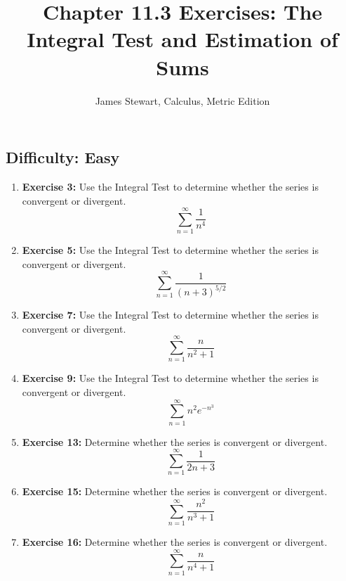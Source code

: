 \documentclass[12pt, a4paper]{article}
\title{Chapter 11.3 Exercises: The Integral Test and Estimation of Sums}
\author{James Stewart, Calculus, Metric Edition}
\date{}
\begin{document}
\maketitle
\hrulefill
\vspace{1em}

\subsection*{Difficulty: Easy}
\begin{enumerate}
    \item \textbf{Exercise 3:} Use the Integral Test to determine whether the series is convergent or divergent.
    \[ \sum_{n=1}^{\infty} \dfrac{1}{n^4} \]

    \item \textbf{Exercise 5:} Use the Integral Test to determine whether the series is convergent or divergent.
    \[ \sum_{n=1}^{\infty} \dfrac{1}{(n+3)^{5/2}} \]

    \item \textbf{Exercise 7:} Use the Integral Test to determine whether the series is convergent or divergent.
    \[ \sum_{n=1}^{\infty} \dfrac{n}{n^2 + 1} \]

    \item \textbf{Exercise 9:} Use the Integral Test to determine whether the series is convergent or divergent.
    \[ \sum_{n=1}^{\infty} n^2 e^{-n^3} \]
    
    \item \textbf{Exercise 13:} Determine whether the series is convergent or divergent.
    \[ \sum_{n=1}^{\infty} \dfrac{1}{2n+3} \]
    
    \item \textbf{Exercise 15:} Determine whether the series is convergent or divergent.
    \[ \sum_{n=1}^{\infty} \dfrac{n^2}{n^3 + 1} \]
    
    \item \textbf{Exercise 16:} Determine whether the series is convergent or divergent.
    \[ \sum_{n=1}^{\infty} \dfrac{n}{n^4 + 1} \]
\end{enumerate}

\hrulefill
\vspace{1em}
\end{document}
